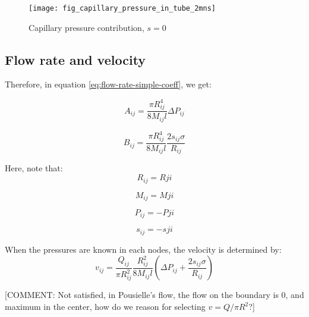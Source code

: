 	\begin{figure}[H]
		\centering
		\texttt{[image: fig\_capillary\_pressure\_in\_tube\_2mns]}
		\caption{Capillary pressure contribution, $s = 0$}
		\label{fig:capillary_pressure_in_tube_2mns}
	\end{figure}
	
\subsection{Flow rate and velocity}
	Therefore, in equation \ref{eq:flow-rate-simple-coeff}, we get:
	
	\begin{equation} \label{eq:flow-rate-aij}
		A_{ij} = \frac{\pi R_{ij}^4}{8M_{ij}l} \Delta P_{ij}
	\end{equation}
	
	\begin{equation} \label{eq:flow-rate-bij}
		B_{ij} = \frac{\pi R_{ij}^4}{8M_{ij}l} \frac{2 s_{ij} \sigma}{R_{ij}}
	\end{equation}
	
	Here, note that:
	\begin{equation}
		R_{ij} = R{ji}
	\end{equation}
	
	\begin{equation}
		M_{ij} = M{ji}
	\end{equation}
	
	\begin{equation}
		P_{ij} = -P{ji}
	\end{equation}
	
	\begin{equation}
		s_{ij} = -s{ji}
	\end{equation}
	
	When the pressures are known in each nodes, the velocity is determined by:
	\begin{equation} \label{eq:velocity-from-pressures}
		v_{ij} = \frac{Q_{ij}}{\pi R_{ij}^2}\frac{R_{ij}^2}{8M_{ij}l} \left( \Delta P_{ij} + \frac{2s_{ij} \sigma}{R_{ij}} \right)
	\end{equation}
	
	[COMMENT: Not satisfied, in Pousielle's flow, the flow on the boundary is 0, and maximum in the center, how do we reason for selecting $v = Q/ \pi R^2$?]

